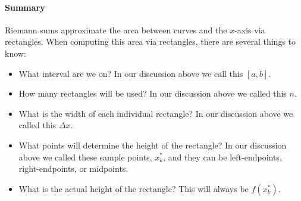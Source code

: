 \documentclass{ximera}
\begin{document}
\paragraph{Summary}

Riemann sums approximate the area between curves and the $x$-axis via
rectangles.  When computing this area via rectangles, there are
several things to know:
\begin{itemize}
\item What interval are we on? In our discussion above we call this
    $[a,b]$.
  \item How many rectangles will be used? In our discussion above we
    called this $n$.
  \item What is the width of each individual rectangle? In our discussion above we
    called this $\Delta x$.
  \item What points will determine the height of the rectangle? In our
    discussion above we called these sample points, $x_k^*$, and they
    can be left-endpoints, right-endpoints, or midpoints.
  \item What is the actual height of the rectangle? This will always
    be $f(x_k^*)$.
\end{itemize}
\end{document}
